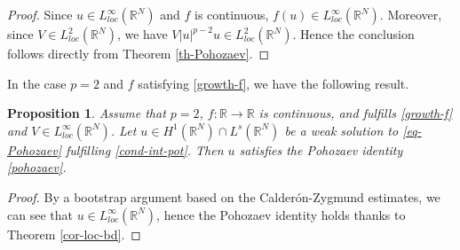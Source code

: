 \documentclass[11pt,reqno]{amsart}
\newtheorem{proposition}[theorem]{Proposition}
\theoremstyle{definition}
\numberwithin{equation}{section}
\numberwithin{theorem}{section}
\numberwithin{equation}{section}
\numberwithin{theorem}{section}
\newcommand{\R}{\mathbb{R}}
\begin{document}
\begin{proof}%
Since $u\in L^\infty_{loc}(\R^N)$ and $f$ is continuous, $f(u)\in L^\infty_{loc}(\R^N)$. Moreover, since $V\in L^2_{loc}(\R^N)$, we have $V|u|^{p-2}u\in L^2_{loc}(\R^N)$. Hence the conclusion follows directly from Theorem \ref{th-Pohozaev}.  
\end{proof}
In the case $p=2$ and $f$ satisfying \ref{growth-f}, we have the following result.
\begin{proposition}\label{prop-p=2}
Assume that $p=2$, $f:\R\to\R$ is continuous, and fulfills \eqref{growth-f} and $V\in L^{\infty}_{loc}(\R^N)$. %
Let $u\in H^1(\R^N)\cap L^s(\R^N)$ be a weak solution to \eqref{eq-Pohozaev} fulfilling \eqref{cond-int-pot}. Then $u$ satisfies the Pohozaev identity \eqref{pohozaev}.
\end{proposition}
\begin{proof}
By a bootstrap argument based on the Calder\'{o}n-Zygmund estimates, we can see that $u\in L^\infty_{loc}(\R^N)$, hence the Pohozaev identity holds thanks to Theorem \ref{cor-loc-bd}.
\end{proof}
\end{document}
